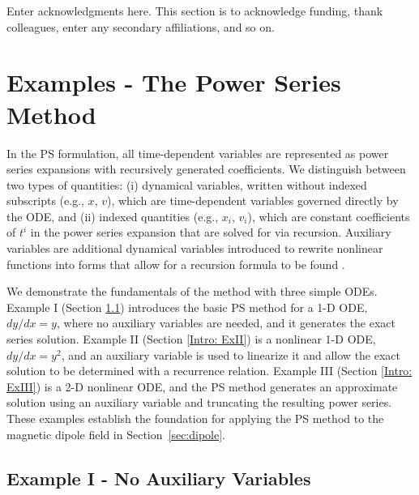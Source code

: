 \documentclass[draft]{agujournal2019}
\begin{document}
\acknowledgments
Enter acknowledgments here. This section is to acknowledge funding, thank colleagues, enter any secondary affiliations, and so on.


%
%




\pagebreak
\appendix

\setcounter{equation}{0} 
\renewcommand{\theequation}{\thesection.\arabic{equation}} 


\section{Examples - The Power Series Method}
\label{sect:examples}
In the PS formulation, all time-dependent variables are represented as power series expansions with recursively generated coefficients. We distinguish between two types of quantities: (i) dynamical variables, written without indexed subscripts (e.g., $x$, $v$), which are time-dependent variables governed directly by the ODE, and (ii) indexed quantities (e.g., $x_i$, $v_i$), which are constant coefficients of $t^i$ in the power series expansion that are solved for via recursion. Auxiliary variables are additional dynamical variables introduced to rewrite nonlinear functions into forms that allow for a recursion formula to be found \cite{Parker1996, Rudmin1998}.

We demonstrate the fundamentals of the method with three simple ODEs. Example I (Section \ref{Intro: ExI}) introduces the basic PS method for a 1-D ODE, $dy/dx=y$, where no auxiliary variables are needed, and it generates the exact series solution. Example II (Section \ref{Intro: ExII}) is a nonlinear 1-D ODE, $dy/dx=y^2$, and an auxiliary variable is used to linearize it and allow the exact solution to be determined with a recurrence relation. Example III (Section \ref{Intro: ExIII}) is a 2-D nonlinear ODE, and the PS method generates an approximate solution using an auxiliary variable and truncating the resulting power series. These examples establish the foundation for applying the PS method to the magnetic dipole field in Section~\ref{sec:dipole}.

\subsection{Example I - No Auxiliary Variables}\label{Intro: ExI}
\end{document}
